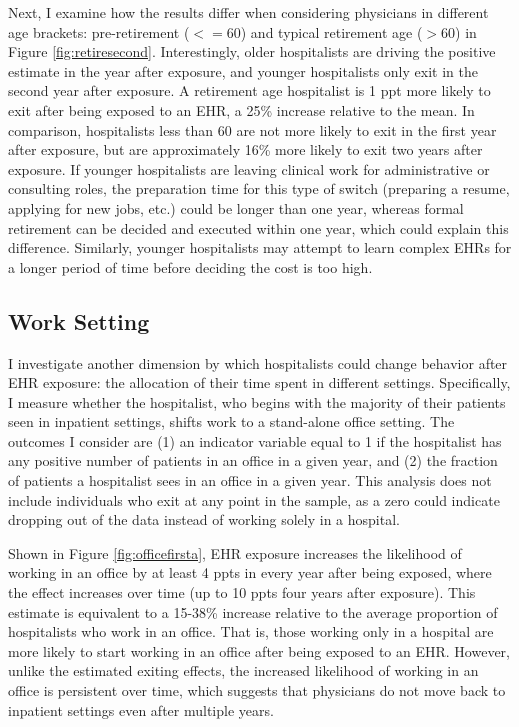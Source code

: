 \documentclass[12pt]{article}
\begin{document}
Next, I examine how the results differ when considering physicians in different age brackets: pre-retirement ($<= 60$) and typical retirement age ($> 60$) in Figure \ref{fig:retiresecond}. Interestingly, older hospitalists are driving the positive estimate in the year after exposure, and younger hospitalists only exit in the second year after exposure. A retirement age hospitalist is 1 ppt more likely to exit after being exposed to an EHR, a 25\% increase relative to the mean. In comparison, hospitalists less than 60 are not more likely to exit in the first year after exposure, but are approximately 16\% more likely to exit two years after exposure. If younger hospitalists are leaving clinical work for administrative or consulting roles, the preparation time for this type of switch (preparing a resume, applying for new jobs, etc.) could be longer than one year, whereas formal retirement can be decided and executed within one year, which could explain this difference. Similarly, younger hospitalists may attempt to learn complex EHRs for a longer period of time before deciding the cost is too high. 


\subsection{Work Setting}

I investigate another dimension by which hospitalists could change behavior after EHR exposure: the allocation of their time spent in different settings. Specifically, I measure whether the hospitalist, who begins with the majority of their patients seen in inpatient settings, shifts work to a stand-alone office setting. The outcomes I consider are (1) an indicator variable equal to 1 if the hospitalist has any positive number of patients in an office in a given year, and (2) the fraction of patients a hospitalist sees in an office in a given year. This analysis does not include individuals who exit at any point in the sample, as a zero could indicate dropping out of the data instead of working solely in a hospital. 

Shown in Figure \ref{fig:officefirsta}, EHR exposure increases the likelihood of working in an office by at least 4 ppts in every year after being exposed, where the effect increases over time (up to 10 ppts four years after exposure). This estimate is equivalent to a 15-38\% increase relative to the average proportion of hospitalists who work in an office. That is, those working only in a hospital are more likely to start working in an office after being exposed to an EHR. However, unlike the estimated exiting effects, the increased likelihood of working in an office is persistent over time, which suggests that physicians do not move back to inpatient settings even after multiple years. 
\end{document}
